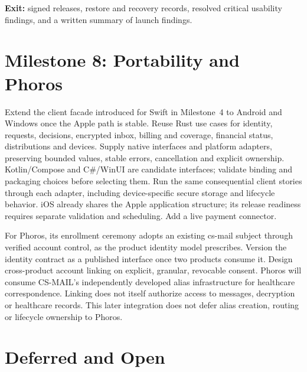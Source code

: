 \documentclass[11pt]{article}
\begin{document}
\textbf{Exit:} signed releases, restore and recovery records, resolved critical
usability findings, and a written summary of launch findings.

\section{Milestone 8: Portability and Phoros}

Extend the client facade introduced for Swift in Milestone~4 to Android and
Windows once the Apple path is stable. Reuse Rust use cases for identity, requests,
decisions, encrypted inbox, billing and coverage, financial status, distributions
and devices. Supply native interfaces and platform adapters, preserving bounded
values, stable errors, cancellation and explicit ownership. Kotlin/Compose and
C\#/WinUI are candidate interfaces; validate binding and packaging choices before
selecting them. Run the same consequential client stories through each adapter,
including device-specific secure storage and lifecycle behavior. iOS already
shares the Apple application structure; its release readiness requires separate
validation and scheduling. Add a live payment connector.

For Phoros, its enrollment ceremony adopts an existing cs-mail subject through
verified account control, as the product identity model prescribes. Version the
identity contract as a published interface once two products consume it. Design
cross-product account linking on explicit, granular, revocable consent.
Phoros will consume CS-MAIL's independently developed alias infrastructure for
healthcare correspondence. Linking does not itself authorize access to messages,
decryption or healthcare records. This later integration does not defer alias
creation, routing or lifecycle ownership to Phoros.

\section{Deferred and Open}
\end{document}
